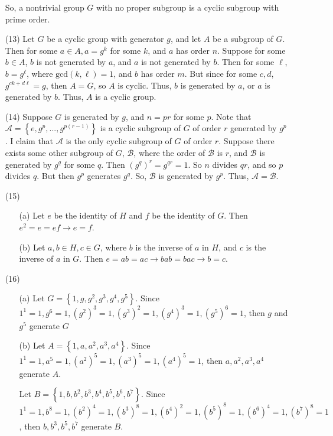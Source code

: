 \documentclass[12pt]{article}
\begin{document}
\begin{itemize}
So, a nontrivial group $G$ with no proper subgroup is a cyclic subgroup with prime order.
\item[(13)]
Let $G$ be a cyclic group with generator $g$, and let $A$ be a subgroup of $G$. Then for some $a \in A, a = g^k$ for some $k$, and $a$ has order $n$. Suppose for some $b \in A$, $b$ is not generated by $a$, and $a$ is not generated by $b$. Then for some $\ell$, $b = g^\ell$, where $\text{gcd}(k, \ell) = 1$, and $b$ has order $m$. But since for some $c, d$, $g^{ck + d\ell} = g$, then $A = G$, so $A$ is cyclic. Thus, $b$ is generated by $a$, or $a$ is generated by $b$. Thus, $A$ is a cyclic group.
\item[(14)]
Suppose $G$ is generated by $g$, and $n = pr$ for some $p$. Note that $\mathcal{A} = \left\lbrace e, g^p, ..., g^{p(r-1)} \right\rbrace$ is a cyclic subgroup of $G$ of order $r$ generated by $g^p$. I claim that $\mathcal{A}$ is the only cyclic subgroup of $G$ of order $r$. Suppose there exists some other subgroup of $G$, $\mathcal{B}$, where the order of $\mathcal{B}$ is $r$, and $\mathcal{B}$ is generated by $g^q$ for some $q$. Then $(g^q)^r = g^{qr} = 1$. So $n$ divides $qr$, and so $p$ divides $q$. But then $g^p$ generates $g^q$. So, $\mathcal{B}$ is generated by $g^p$. Thus, $\mathcal{A} = \mathcal{B}$.
\item[(15)]
\begin{itemize}
\item[(a)]
Let $e$ be the identity of $H$ and $f$ be the identity of $G$. Then $e^2 = e = ef \rightarrow e = f$.
\item[(b)]
Let $a, b \in H, c \in G$, where $b$ is the inverse of $a$ in $H$, and $c$ is the inverse of $a$ in $G$. Then $e = ab = ac \rightarrow bab = bac \rightarrow b = c$.
\end{itemize}
\item[(16)]
\begin{itemize}
\item[(a)]
Let $G = \left\lbrace 1, g, g^2, g^3, g^4, g^5 \right\rbrace$. Since $1^1 = 1, g^6 = 1, (g^2)^3 = 1, (g^3)^2 = 1, (g^4)^3 = 1, (g^5)^6 = 1$, then $g$ and $g^5$ generate $G$
\item[(b)]
Let $A = \left\lbrace 1, a, a^2, a^3, a^4 \right\rbrace$. Since $1^1 = 1, a^5 = 1, (a^2)^5 = 1, (a^3)^5 = 1, (a^4)^5 = 1$, then $a, a^2, a^3, a^4$ generate $A$.

Let $B = \left\lbrace 1, b, b^2, b^3, b^4, b^5, b^6, b^7 \right\rbrace$. Since $1^1 = 1, b^8 = 1, (b^2)^4 = 1, (b^3)^8 = 1, (b^4)^2 = 1, (b^5)^8 = 1, (b^6)^4 = 1, (b^7)^8 = 1$, then $b, b^3, b^5, b^7$ generate $B$.


\end{itemize}
\end{itemize}
\end{document}
